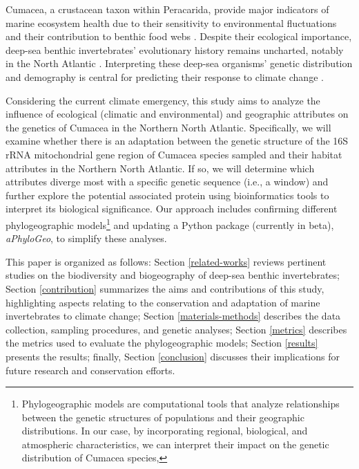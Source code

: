 Cumacea, a crustacean taxon within Peracarida, provide major indicators of marine ecosystem health due to their sensitivity to environmental fluctuations \citep{stransky_diversity_2010} and their contribution to benthic food webs \citep{rehm2009cumacea}. Despite their ecological importance, deep-sea benthic invertebrates’ evolutionary history remains uncharted, notably in the North Atlantic \citep{jennings_phylogeographic_2014}. Interpreting these deep-sea organisms' genetic distribution and demography is central for predicting their response to climate change \citep{jennings_phylogeographic_2014}. 

Considering the current climate emergency, this study aims to analyze the influence of ecological (climatic and environmental) and geographic attributes on the genetics of Cumacea in the Northern North Atlantic. Specifically, we will examine whether there is an adaptation between the genetic structure of the 16S rRNA mitochondrial gene region of Cumacea species sampled and their habitat attributes in the Northern North Atlantic. If so, we will determine which attributes diverge most with a specific genetic sequence (i.e., a window) and further explore the potential associated protein using bioinformatics tools to interpret its biological significance. Our approach includes confirming different {phylogeographic models}\footnote{Phylogeographic models are computational tools that analyze relationships between the genetic structures of populations and their geographic distributions. In our case, by incorporating regional, biological, and atmospheric characteristics, we can interpret their impact on the genetic distribution of Cumacea species,} and updating a Python package (currently in beta), \textit{aPhyloGeo}, to simplify these analyses.

This paper is organized as follows: Section \autoref{related-works} reviews pertinent studies on the biodiversity and biogeography of deep-sea benthic invertebrates; Section \autoref{contribution} summarizes the aims and contributions of this study, highlighting aspects relating to the conservation and adaptation of marine invertebrates to climate change; Section \autoref{materials-methods} describes the data collection, sampling procedures, and genetic analyses; Section \autoref{metrics} describes the metrics used to evaluate the phylogeographic models; Section \autoref{results} presents the results; finally, Section \autoref{conclusion} discusses their implications for future research and conservation efforts.

